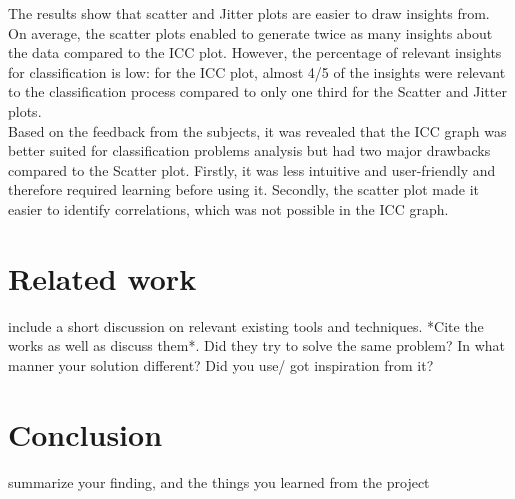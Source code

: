 \documentclass[12pt]{article}
\begin{document}
The results show that scatter and Jitter plots are easier to draw insights from. On average, the scatter plots enabled to generate twice as many insights about the data compared to the ICC plot. However, the percentage of relevant insights for classification is low: for the ICC plot, almost 4/5 of the insights were relevant to the classification process compared to only one third for the Scatter and Jitter plots.\\
Based on the feedback from the subjects, it was revealed that the ICC graph was better suited for classification problems analysis but had two major drawbacks compared to the Scatter plot. Firstly, it was less intuitive and user-friendly and therefore required learning before using it. Secondly, the scatter plot made it easier to identify correlations, which was not possible in the ICC graph.




\section{Related work}\label{Related work}
include a short discussion on relevant existing tools and
techniques. *Cite the works as well as discuss them*. Did they try to
solve the same problem? In what manner your solution different? Did
you use/ got inspiration from it? 

\section{Conclusion}\label{Conclusion}
summarize your finding, and the things you learned from
the project



\end{document}
